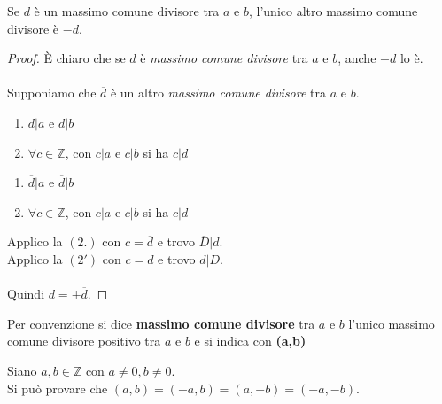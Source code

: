 \documentclass[a4paper,12pt, oneside]{book}
\begin{document}
	\begin{teorema}
		Se $d$ è un massimo comune divisore tra $a$ e $b$, l'unico altro massimo comune divisore è $-d$.
		
		\begin{proof}
			È chiaro che se $d$ è \textit{massimo comune divisore} tra $a$ e $b$, anche $-d$ lo è.\\\\
			Supponiamo che $\overline{d}$ è un altro \textit{massimo comune divisore} tra $a$ e $b$.
			\begin{enumerate}
				\item $d|a$ e $d|b$
				\item $\forall c \in \mathbb{Z}$, con $c|a$ e $c|b$ si ha $c|d$
			\end{enumerate}
			\begin{enumerate}[label=\arabic*']
				\item $\overline{d}|a$ e $\overline{d}|b$
				\item $\forall c \in \mathbb{Z}$, con $c|a$ e $c|b$ si ha $c|\overline{d}$
			\end{enumerate}
			Applico la $(2.)$ con $c = \overline{d}$ e trovo $\overline{D}|d$.\\
			Applico la $(2')$ con $c = d$ e trovo $d|\overline{D}$.\\\\
			Quindi $d = \pm \overline{d}$.
		\end{proof}
	\end{teorema}
	\begin{nota}
		Per convenzione si dice \textbf{massimo comune divisore} tra $a$ e $b$ l'unico massimo comune divisore positivo tra $a$ e $b$ e si indica con \textbf{(a,b)}
	\end{nota}
	\begin{osservazione}
		Siano $a, b \in \mathbb{Z}$ con $a \not = 0, b \not = 0$.\\
		Si può provare che $(a,b) = (-a,b) = (a,-b) = (-a,-b)$.
	\end{osservazione}
	
\end{document}
